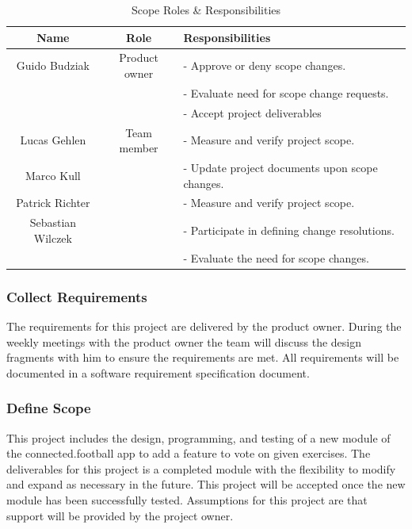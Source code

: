 \begin{table}[H]
    \centering
    \begin{tabular}{|c|c|l|}
        \hline
        \cellcolor{gray}Name & 
        \cellcolor{gray}Role &
        \cellcolor{gray}Responsibilities \\\hline
        Guido Budziak & Product owner &- Approve or deny scope changes.\\&&- Evaluate need for scope change requests.\\&&- Accept project deliverables\\\hline
        Lucas Gehlen&Team member&- Measure and verify project scope.\\
        Marco Kull&&- Update project documents upon scope changes.\\
        Patrick Richter&&- Measure and verify project scope.\\
        Sebastian Wilczek&&- Participate in defining change resolutions.\\
        &&- Evaluate the need for scope changes.\\\hline
    \end{tabular}
    \caption{Scope Roles \& Responsibilities}
    \label{tab:scope_roles}
\end{table}

\subsubsection{Collect Requirements}
\label{sssec:collect_requirements}

The requirements for this project are delivered by the product owner. During the weekly meetings with the product owner the team will discuss the design fragments with him to ensure the requirements are met. All requirements will be documented in a software requirement specification document.

\subsubsection{Define Scope}
\label{sssec:define_scope}

This project includes the design, programming, and testing of a new module of the connected.football app to add a feature to vote on given exercises. The deliverables for this project is a completed module with the flexibility to modify and expand as necessary in the future. This project will be accepted once the new module has been successfully tested. Assumptions for this project are that support will be provided by the project owner.

